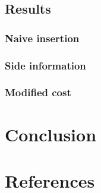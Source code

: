 \documentclass[12pt]{article}
\begin{document}
\subsection{Results}
\subsubsection{Naive insertion}
\subsubsection{Side information}
\subsubsection{Modified cost}

\section{Conclusion}

\section*{References}
\end{document}
